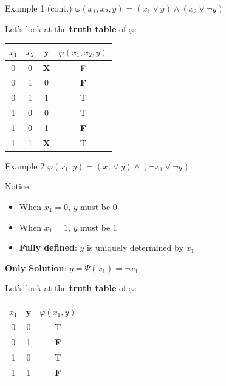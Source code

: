 \documentclass[aspectratio=169]{beamer}
\begin{document}
\begin{frame}{Example 1 (cont.)}
$\varphi(x_1, x_2, y) = (x_1 \lor y) \land (x_2 \lor \neg y)$
\bigskip

Let's look at the \textbf{truth table} of \(\varphi\):

\begin{tabular}{|c|c|c|c|}
    \hline
    $x_1$ & $x_2$ & $\mathbf{y}$ & $\varphi(x_1, x_2, y)$ \\
    \hline
    0 & 0 & \textbf{X} & F\\
    0 & 1 & 0 & \textbf{F}\\
    0 & 1 & 1 & T\\
    1 & 0 & 0 & T\\
    1 & 0 & 1 & \textbf{F}\\
    1 & 1 & \textbf{X} & T\\
    \hline
\end{tabular}
\end{frame}

\begin{frame}{Example 2}
$\varphi(x_1, y) = (x_1 \lor y) \land (\neg x_1 \lor \neg y)$
\bigskip

Notice:
\begin{itemize}
    \item When $x_1 = 0$, $y$ must be $0$
    \item When $x_1 = 1$, $y$ must be $1$
    \item \textbf{Fully defined}: $y$ is uniquely determined by $x_1$
\end{itemize}
\bigskip

\textbf{Only Solution}: $y = \Psi(x_1) = \neg x_1$
\bigskip

Let's look at the \textbf{truth table} of \(\varphi\):
\begin{tabular}{|c|c|c|}
    \hline
    $x_1$ & $\mathbf{y}$ & $\varphi(x_1, y)$ \\
    \hline
    0 & 0 & T\\
    0 & 1 & \textbf{F}\\
    1 & 0 & T\\
    1 & 1 & \textbf{F}\\
    \hline
\end{tabular}
\end{frame}
\end{document}
